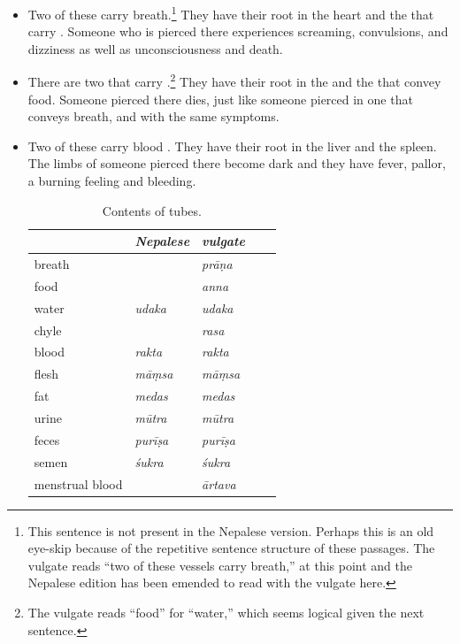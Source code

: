 \begin{refsection}
\begin{translation}
    \begin{itemize}
\item 

Two of these carry breath.\footnote{This sentence is not present in
    the Nepalese version.  Perhaps this is an old eye-skip because of the
    repetitive sentence structure of these passages.  The vulgate reads
     “two of these vessels carry breath,” at this
    point and the Nepalese edition has been emended to read with the
    vulgate here.} They have their root in the heart and the
     that carry . Someone who is
    pierced there experiences screaming, convulsions, and dizziness as
    well as unconsciousness and death. \item There are two that carry
    .\footnote{The vulgate reads “food” for “water,”
        which seems logical given the next sentence.} They have their root in
        the  and the  that convey
        food.  Someone pierced there dies, just like someone pierced in one
        that conveys breath, and with the same symptoms.
  
\item   

Two of these carry blood .  They have their root in the 
liver and the spleen.  The limbs of someone pierced there become dark and they 
have fever, pallor, a burning feeling and bleeding. 
\begin{table}[t]
    \centering    \footnotesize
    \begin{tabular}{l>{\it}l>{\it}lll}
        & {\rm Nepalese} & {\rm vulgate} &  &   \\
        \toprule
       breath& & prāṇa   &  &    \\
     food   & & anna    &  &    \\
    water&    udaka    & udaka    &   &  \\
  chyle&      & rasa    &  &   \\
       blood &  rakta    & rakta   &  &  \\
 flesh &       māṃsa    & māṃsa   &  &    \\
    fat &     medas    & medas   &  &   \\
  urine &         mūtra    & mūtra   &  & \\
     feces&     purīṣa   & purīṣa  &  &  \\
    semen &      śukra    & śukra   &  &  \\
    menstrual blood &     & ārtava  &  &  \\
        \bottomrule
    \end{tabular}
    \caption{Contents of tubes.}
    \label{tubecontents}
\end{table}


\end{itemize}
\end{translation}
\end{refsection}

